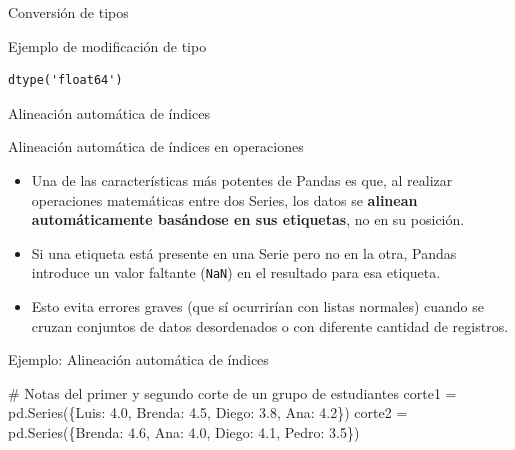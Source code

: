 \documentclass[
  ignorenonframetext,
  aspectratio=169,
  spanish,
]{beamer}
\newenvironment{Shaded}{\begin{snugshade}}{\end{snugshade}}
\newcommand{\CommentTok}[1]{\textcolor[rgb]{0.37,0.37,0.37}{#1}}
\newcommand{\FloatTok}[1]{\textcolor[rgb]{0.68,0.00,0.00}{#1}}
\newcommand{\NormalTok}[1]{\textcolor[rgb]{0.00,0.23,0.31}{#1}}
\newcommand{\OperatorTok}[1]{\textcolor[rgb]{0.37,0.37,0.37}{#1}}
\newcommand{\StringTok}[1]{\textcolor[rgb]{0.13,0.47,0.30}{#1}}
\providecommand{\tightlist}{%
  \setlength{\itemsep}{0pt}\setlength{\parskip}{0pt}}
\begin{document}
\begin{frame}[fragile]{Conversión de tipos}
\begin{block}{Ejemplo de modificación de tipo}
\begin{verbatim}
dtype('float64')
\end{verbatim}
\end{block}
\end{frame}

\begin{frame}[fragile]{Alineación automática de índices}
\label{alineaciuxf3n-automuxe1tica-de-uxedndices}
\begin{block}{Alineación automática de índices en operaciones}
\label{alineaciuxf3n-automuxe1tica-de-uxedndices-en-operaciones}
\begin{itemize}
\tightlist
\item
  Una de las características más potentes de Pandas es que, al realizar
  operaciones matemáticas entre dos Series, los datos se \textbf{alinean
  automáticamente basándose en sus etiquetas}, no en su posición.
\item
  Si una etiqueta está presente en una Serie pero no en la otra, Pandas
  introduce un valor faltante (\texttt{NaN}) en el resultado para esa
  etiqueta.
\item
  Esto evita errores graves (que sí ocurrirían con listas normales)
  cuando se cruzan conjuntos de datos desordenados o con diferente
  cantidad de registros.
\end{itemize}
\end{block}

\begin{block}{Ejemplo: Alineación automática de índices}
\label{ejemplo-alineaciuxf3n-automuxe1tica-de-uxedndices}
\label{annotated-cell-20}%
\begin{Shaded}
\begin{Highlighting}[]
\CommentTok{\# Notas del primer y segundo corte de un grupo de estudiantes}
\NormalTok{corte1 }\OperatorTok{=}\NormalTok{ pd.Series(\{}\StringTok{\textquotesingle{}Luis\textquotesingle{}}\NormalTok{: }\FloatTok{4.0}\NormalTok{, }\StringTok{\textquotesingle{}Brenda\textquotesingle{}}\NormalTok{: }\FloatTok{4.5}\NormalTok{, }\StringTok{\textquotesingle{}Diego\textquotesingle{}}\NormalTok{: }\FloatTok{3.8}\NormalTok{, }\StringTok{\textquotesingle{}Ana\textquotesingle{}}\NormalTok{: }\FloatTok{4.2}\NormalTok{\})}
\NormalTok{corte2 }\OperatorTok{=}\NormalTok{ pd.Series(\{}\StringTok{\textquotesingle{}Brenda\textquotesingle{}}\NormalTok{: }\FloatTok{4.6}\NormalTok{, }\StringTok{\textquotesingle{}Ana\textquotesingle{}}\NormalTok{: }\FloatTok{4.0}\NormalTok{, }\StringTok{\textquotesingle{}Diego\textquotesingle{}}\NormalTok{: }\FloatTok{4.1}\NormalTok{, }\StringTok{\textquotesingle{}Pedro\textquotesingle{}}\NormalTok{: }\FloatTok{3.5}\NormalTok{\}) }


\end{Highlighting}
\end{Shaded}
\end{block}
\end{frame}
\end{document}
